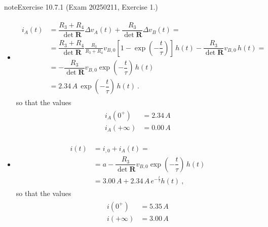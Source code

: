 \documentclass[letterpaper,10pt,italian]{jupyterBook}
\begin{document}
\begin{sphinxadmonition}{note}{Exercise 10.7.1 (Exam 2025\sphinxhyphen{}02\sphinxhyphen{}11, Exercise 1.)}
\begin{itemize}
\begin{equation*}
\end{equation*}
\item {} 
\sphinxAtStartPar
{}
\begin{equation*}
\begin{split}\begin{aligned}
     i_A(t)
     & = \dfrac{R_3+R_4}{\det \mathbf{R}} \Delta v_A(t) + \dfrac{R_3}{\det \mathbf{R}} \Delta v_B(t) = \\
     & = \dfrac{R_3+R_4}{\det \mathbf{R}} \frac{R_3}{R_3 + R_4} v_{B,0} \left[ 1 - \exp\left( - \dfrac{t}{\tau} \right) \right] \, h(t) - \dfrac{R_3}{\det \mathbf{R}} v_{B,0} \, h(t) = \\
     & = - \dfrac{R_3}{\det \mathbf{R}} v_{B,0} \exp\left( - \dfrac{t}{\tau} \right) \, h(t) \\
     & = 2.34 \, A \, \exp\left( - \dfrac{t}{\tau} \right) \, h(t) \ .
   \end{aligned}\end{split}
\end{equation*}
\sphinxAtStartPar
so that the values
\begin{equation*}
\begin{split}\begin{aligned}
     i_A(0^+)     & = 2.34 \, A \\
     i_A(+\infty) & = 0.00 \, A
   \end{aligned}\end{split}
\end{equation*}
\item {} 
\sphinxAtStartPar
{}
\begin{equation*}
\begin{split}\begin{aligned}
     i(t) 
     & = i_{,0} + i_A(t) = \\
     & = a - \dfrac{R_3}{\det \mathbf{R}} v_{B,0} \exp\left( - \dfrac{t}{\tau} \right) \, h(t) \\
     & = 3.00 \, A + 2.34 \, A \, e^{-\frac{t}{\tau}} h(t) \ ,
   \end{aligned}\end{split}
\end{equation*}
\sphinxAtStartPar
so that the values
\begin{equation*}
\begin{split}\begin{aligned}
     i(0^+)     & = 5.35 \, A \\
     i(+\infty) & = 3.00 \, A
   \end{aligned}\end{split}
\end{equation*}
\end{itemize}


\end{sphinxadmonition}
\end{document}

